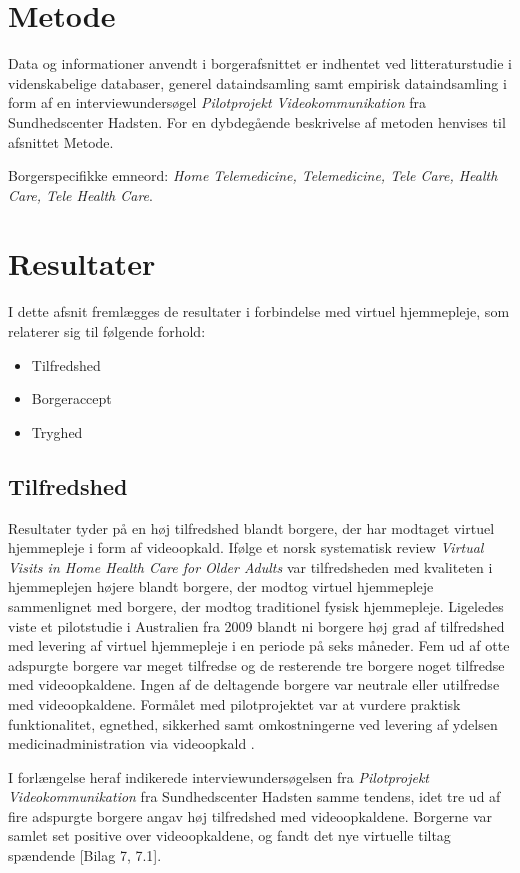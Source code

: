 \section{Metode}
Data og informationer anvendt i borgerafsnittet er indhentet ved litteraturstudie i videnskabelige databaser, generel dataindsamling samt empirisk dataindsamling i form af en interviewundersøgel \textit{Pilotprojekt Videokommunikation} fra Sundhedscenter Hadsten. For en dybdegående beskrivelse af metoden henvises til afsnittet Metode.

Borgerspecifikke emneord: \textit{Home Telemedicine, Telemedicine, Tele Care, Health Care, Tele Health Care}.

\section{Resultater}
I dette afsnit fremlægges de resultater i forbindelse med virtuel hjemmepleje, som relaterer sig til følgende forhold:
\begin{itemize}
	\item Tilfredshed
	\item Borgeraccept 
	\item Tryghed
\end{itemize}

\subsection{Tilfredshed}
Resultater tyder på en høj tilfredshed blandt borgere, der har modtaget virtuel hjemmepleje i form af videoopkald. Ifølge et norsk systematisk review \textit{Virtual Visits in Home Health Care for Older Adults} var tilfredsheden med kvaliteten i hjemmeplejen højere blandt borgere, der modtog virtuel hjemmepleje sammenlignet med borgere, der modtog traditionel fysisk hjemmepleje\cite{Baf2}. Ligeledes viste et pilotstudie i Australien fra 2009 blandt ni borgere høj grad af tilfredshed med levering af virtuel hjemmepleje i en periode på seks måneder. Fem ud af otte adspurgte borgere var meget tilfredse og de resterende tre borgere noget tilfredse med videoopkaldene. Ingen af de deltagende borgere var neutrale eller utilfredse med videoopkaldene. Formålet med pilotprojektet var at vurdere praktisk funktionalitet, egnethed, sikkerhed samt omkostningerne ved levering af ydelsen medicinadministration via videoopkald \cite{wade}. 

I forlængelse heraf indikerede interviewundersøgelsen fra \textit{Pilotprojekt Videokommunikation} fra Sundhedscenter Hadsten samme tendens, idet tre ud af fire adspurgte borgere angav høj tilfredshed med videoopkaldene. Borgerne var samlet set positive over videoopkaldene, og fandt det nye virtuelle tiltag spændende [Bilag 7, 7.1]. 

